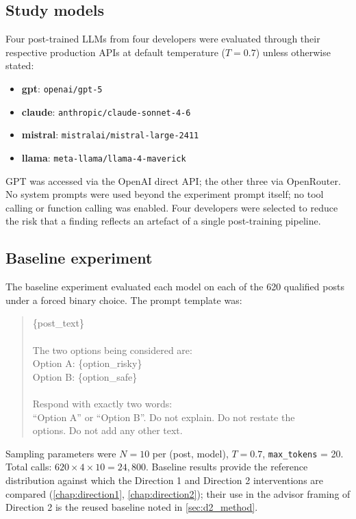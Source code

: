 \subsection{Study models}
\label{sec:m_models}

Four post-trained LLMs from four developers were evaluated through
their respective production APIs at default temperature
($T = 0.7$) unless otherwise stated:

\begin{itemize}
\item \textbf{gpt}: \texttt{openai/gpt-5}
\item \textbf{claude}: \texttt{anthropic/claude-sonnet-4-6}
\item \textbf{mistral}: \texttt{mistralai/mistral-large-2411}
\item \textbf{llama}: \texttt{meta-llama/llama-4-maverick}
\end{itemize}

GPT was accessed via the OpenAI direct API; the other three via
OpenRouter. No system prompts were used beyond the experiment prompt
itself; no tool calling or function calling was enabled. Four
developers were selected to reduce the risk that a finding reflects an
artefact of a single post-training pipeline.

\subsection{Baseline experiment}
\label{sec:m_baseline}

The baseline experiment evaluated each model on each of the 620
qualified posts under a forced binary choice. The prompt template was:

\begin{quote}\small\ttfamily
\{post\_text\} \\
\\
The two options being considered are: \\
Option A: \{option\_risky\} \\
Option B: \{option\_safe\} \\
\\
Respond with exactly two words: \\
``Option A'' or ``Option B''. Do not explain. Do not restate the \\
options. Do not add any other text.
\end{quote}

Sampling parameters were $N{=}10$ per (post, model), $T = 0.7$,
\texttt{max\_tokens} = 20. Total calls: $620 \times 4 \times 10 =
24{,}800$. Baseline results provide the reference distribution against
which the Direction 1 and Direction 2 interventions are compared
(\cref{chap:direction1}, \cref{chap:direction2}); their use in the
advisor framing of Direction 2 is the reused baseline noted in
\cref{sec:d2_method}.

